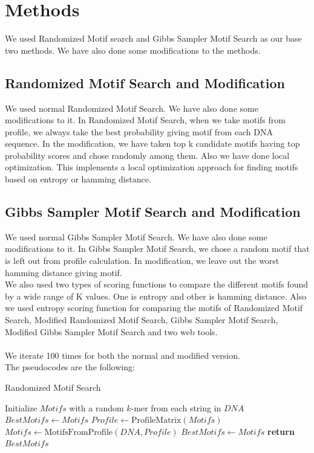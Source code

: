 \documentclass{article}
\begin{document}
\section{Methods}
We used Randomized Motif search and Gibbs Sampler Motif Search as our base two methods. We have also done some modifications to the methods.
\subsection{Randomized Motif Search and Modification}
We used normal Randomized Motif Search. We have also done some modifications to it. In Randomized Motif Search, when we take motifs from profile, we always take the best probability giving motif from each DNA sequence. In the modification, we have taken top k candidate motifs having top probability scores and chose randomly among them. Also we have done local optimization. This implements a local optimization approach for finding motifs based on entropy or hamming distance.

\subsection{Gibbs Sampler Motif Search and Modification}
We used normal Gibbs Sampler Motif Search. We have also done some modifications to it. In Gibbs Sampler Motif Search, we chose a random motif that is left out from profile calculation. In modification, we leave out the worst hamming distance giving motif. \\

We also used two types of scoring functions to compare the different motifs found by a wide range of K values. One is entropy and other is hamming distance. Also we used entropy scoring function for comparing the motifs of Randomized Motif Search, Modified Randomized Motif Search, Gibbs Sampler Motif Search, Modified Gibbs Sampler Motif Search and two web tools.\\\\
We iterate 100 times for both the normal and modified version.\\

The pseudocodes are the following:
\begin{algorithm}
  \caption{Randomized Motif Search}
  \begin{algorithmic}[1]
      \State Initialize $Motifs$ with a random $k$-mer from each string in $DNA$
      \State $BestMotifs \gets Motifs$
        \State $Profile \gets \text{ProfileMatrix}(Motifs)$
        \State $Motifs \gets \text{MotifsFromProfile}(DNA, Profile)$
          \State $BestMotifs \gets Motifs$
        \Else
          \State \textbf{return} $BestMotifs$
        \EndIf
      \EndWhile
    \EndFunction
  \end{algorithmic}
\end{algorithm}
\end{document}
